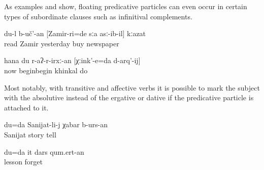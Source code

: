 As examples  and  show, floating predicative particles can even occur in certain types of subordinate clauses such as infinitival complements.
%
\begin{exe}
	\ex	\label{ex:I had to read the newspaper that ZAMIR bought yesterday@25a}
	\gll	du-l	b-uč'-an	[Zamir-ri=de	sːa	asː-ib-il]	kːazat\\
			read	Zamir	yesterday	buy	newspaper\\
	\glt	{}

	\ex	\label{ex:Now I will / have to start to make KHINKAL@6}
	\gll	hana	du	r-aʔ-r-irxː-an	[χːink'-e=da	d-arq'-ij]\\
		now		beginbegin	khinkal	do\\
	\glt	{}
\end{exe}

Most notably, with transitive and affective verbs it is possible to mark the subject with the absolutive instead of the ergative or dative if the predicative particle is attached to it.
%
\begin{exe}
	\ex	\label{ex:I will / have to tell Sanijat the story@8a}
	\gll	du=da	Sanijat-li-j	χabar	b-urs-an\\
			Sanijat	story	tell\\
	\glt	{}

	\ex	\label{ex:I will not forget this lesson@8b}
	\gll	du=da	it	dars	qum.ert-an\\
				lesson	forget\\
	\glt	{}
\end{exe}

